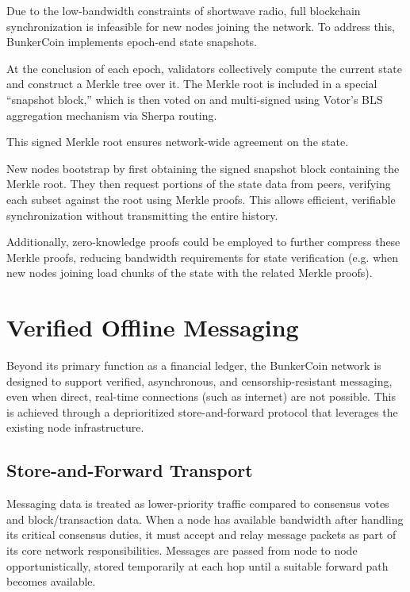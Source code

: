 \documentclass{article}
\begin{document}
Due to the low-bandwidth constraints of shortwave radio, full blockchain synchronization is infeasible for new nodes joining the network. To address this, BunkerCoin implements epoch-end state snapshots.

At the conclusion of each epoch, validators collectively compute the current state and construct a Merkle tree over it. The Merkle root is included in a special ``snapshot block,'' which is then voted on and multi-signed using Votor's BLS aggregation mechanism via Sherpa routing.

This signed Merkle root ensures network-wide agreement on the state.

New nodes bootstrap by first obtaining the signed snapshot block containing the Merkle root. They then request portions of the state data from peers, verifying each subset against the root using Merkle proofs. This allows efficient, verifiable synchronization without transmitting the entire history.

Additionally, zero-knowledge proofs could be employed to further compress these Merkle proofs, reducing bandwidth requirements for state verification (e.g. when new nodes joining load chunks of the state with the related Merkle proofs).

\section{Verified Offline Messaging}
\label{sec:messaging}

Beyond its primary function as a financial ledger, the BunkerCoin network is designed to support verified, asynchronous, and censorship-resistant messaging, even when direct, real-time connections (such as internet) are not possible. This is achieved through a deprioritized store-and-forward protocol that leverages the existing node infrastructure.

\subsection{Store-and-Forward Transport}

Messaging data is treated as lower-priority traffic compared to consensus votes and block/transaction data. When a node has available bandwidth after handling its critical consensus duties, it must accept and relay message packets as part of its core network responsibilities. Messages are passed from node to node opportunistically, stored temporarily at each hop until a suitable forward path becomes available.
\end{document}
